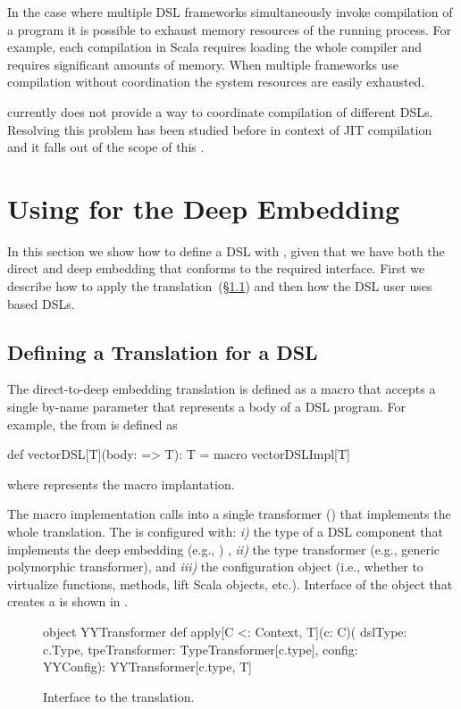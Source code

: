 In the case where multiple DSL frameworks simultaneously invoke compilation
of a program it is possible to exhaust memory resources of the running process. For example, each
compilation in Scala requires loading the whole compiler and requires significant
amounts of memory. When multiple frameworks use compilation without coordination the
system resources are easily exhausted.

\yy currently does not provide a way to coordinate compilation of different DSLs. Resolving this
 problem has been studied before in context of JIT compilation~\cite{arnold2000adaptive,kulkarni2011} and
 it falls out of the scope of this \work.

\section{Using \yy for the Deep Embedding}
\label{sec:using-yy}

In this section we show how to define a DSL with \yy, given that we have
 both the direct and deep embedding that conforms to the required interface.
 First we describe how to apply the translation~(\S \ref{sec:defining-a-translation}) and
 then how the DSL user uses \yy based DSLs.

\subsection{Defining a Translation for a DSL}
\label{sec:defining-a-translation}

The direct-to-deep embedding translation is defined as a macro that accepts a single by-name parameter that represents
a body of a DSL program. For example, the  from  is defined as\begin{lstparagraph}
def vectorDSL[T](body: => T): T = macro vectorDSLImpl[T]
\end{lstparagraph}

where  represents the macro implantation.

The macro implementation calls into a single transformer () that
implements the whole translation. The  is configured with: \emph{i)} the type of
a DSL component that implements the deep embedding (e.g., )
, \emph{ii)} the type transformer (e.g., generic polymorphic transformer), and
\emph{iii)} the configuration object (i.e., whether to virtualize functions, methods, lift Scala objects, etc.).
Interface of the object that creates a  is shown in .
\begin{figure}
\begin{lstparagraph}
object YYTransformer {
  def apply[C <: Context, T](c: C)(
    dslType: c.Type,
    tpeTransformer: TypeTransformer[c.type],
    config: YYConfig): YYTransformer[c.type, T]
}
\end{lstparagraph}
\caption{Interface to the \yy translation.}
\label{fig:YYTransformer}
\end{figure}

